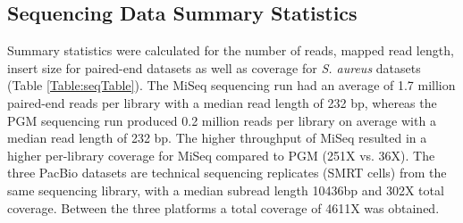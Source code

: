 \documentclass[smallextended]{svjour3}\usepackage[]{graphicx}\usepackage[]{color}
\begin{document}
\subsection{Sequencing Data Summary Statistics}
Summary statistics were calculated for the number of reads, mapped read length, insert size for paired-end datasets as well as coverage for \textit{S. aureus} datasets (Table \ref{Table:seqTable}). The MiSeq sequencing run had an average of  1.7 million paired-end reads per library with a median read length of  232 bp,  whereas the PGM sequencing run produced 0.2 million reads per library on average with a median read length of 232 bp.  The higher throughput of MiSeq resulted in a higher per-library coverage for MiSeq compared to PGM (251X vs. 36X).  The three PacBio datasets are technical sequencing replicates (SMRT cells) from the same sequencing library, with a median subread length 10436bp and 302X total coverage. Between the three platforms a total coverage of 4611X was obtained.
\end{document}
